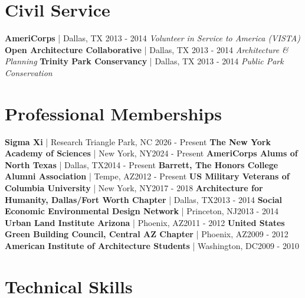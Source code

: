 \documentclass{article}
\begin{document}
    \section*{Civil Service}
        \textbf{AmeriCorps} | Dallas, TX \hfill{2013 - 2014}\newline
        \textit{Volunteer in Service to America (VISTA)}\newline\newline
        \textbf{Open Architecture Collaborative} | Dallas, TX \hfill{2013 - 2014}\newline
        \textit{Architecture \& Planning}\newline\newline
        \textbf{Trinity Park Conservancy} | Dallas, TX \hfill{2013 - 2014}\newline
        \textit{Public Park Conservation}
    \section*{Professional Memberships}
        \textbf{Sigma Xi} | Research Triangle Park, NC \hfill{2026 - Present}\newline
        \textbf{The New York Academy of Sciences} | New York, NY\hfill{2024 - Present}\newline
        \textbf{AmeriCorps Alums of North Texas} | Dallas, TX\hfill{2014 - Present}\newline
        \textbf{Barrett, The Honors College Alumni Association} | Tempe, AZ\hfill{2012 - Present}\newline
        \textbf{US Military Veterans of Columbia University} | New York, NY\hfill{2017 - 2018}\newline
        \textbf{Architecture for Humanity, Dallas/Fort Worth Chapter} | Dallas, TX\hfill{2013 - 2014}\newline
        \textbf{Social Economic Environmental Design Network} | Princeton, NJ\hfill{2013 - 2014}\newline
        \textbf{Urban Land Institute Arizona} | Phoenix, AZ\hfill{2011 - 2012}\newline
        \textbf{United States Green Building Council, Central AZ Chapter} | Phoenix, AZ\hfill{2009 - 2012}\newline
        \textbf{American Institute of Architecture Students} | Washington, DC\hfill{2009 - 2010}
    \section*{Technical Skills}
\end{document}

